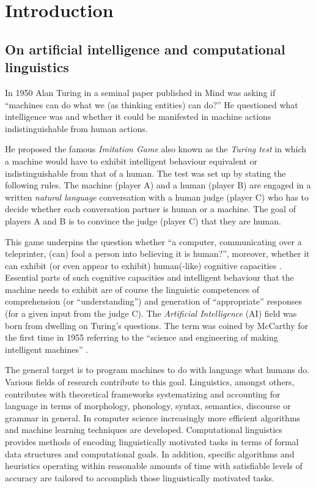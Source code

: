 \chapter{Introduction}
\label{ch:introduction}

\section{On artificial intelligence and computational linguistics}
In 1950 Alan Turing in a seminal paper \citep{Turing1950} published in Mind was asking if ``machines can do what we (as thinking entities) can do?'' He questioned what intelligence was and whether it could be manifested in machine actions indistinguishable from human actions. 

He proposed the famous \textit{Imitation Game} also known as the \textit{Turing test} in which a machine would have to exhibit intelligent behaviour equivalent or indistinguishable from that of a human. The test was set up by stating the following rules. The machine (player A) and a human (player B) are engaged in a written \textit{natural language} conversation with a human judge (player C) who has to decide whether each conversation partner is human or a machine. The goal of players A and B is to convince the judge (player C) that they are human. 

This game underpins the question whether ``a computer, communicating over a teleprinter, (can) fool a person into believing it is human?'', moreover, whether it can exhibit (or even appear to exhibit) human(-like) cognitive capacities \citep{Harnad1992}. Essential parts of such cognitive capacities and intelligent behaviour that the machine needs to exhibit are of course the linguistic competences of comprehension (or ``understanding'') and generation of ``appropriate'' responses (for a given input from the judge C). The \textit{Artificial Intelligence} (AI) field was born from dwelling on Turing's questions. The term was coined by McCarthy for the first time in 1955 referring to the ``science and engineering of making intelligent machines'' \citep{McCarthy1955}.

The general target is to program machines to do with language what humans do. Various fields of research contribute to this goal. Linguistics, amongst others, contributes with theoretical frameworks systematizing and accounting for language in terms of morphology, phonology, syntax, semantics, discourse or grammar in general. In computer science increasingly more efficient algorithms and machine learning techniques are developed. Computational linguistics provides methods of encoding linguistically motivated tasks in terms of formal data structures and computational goals. In addition, specific algorithms and heuristics operating within reasonable amounts of time with satisfiable levels of accuracy are tailored to accomplish those linguistically motivated tasks.

